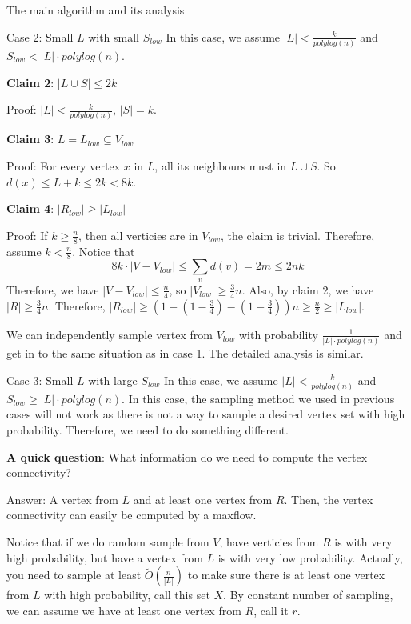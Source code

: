 \documentclass{article}
\begin{document}
\begin{section}{The main algorithm and its analysis}
  \begin{subsection}{Case 2: Small $L$ with small $S_{low}$}
    In this case, we assume $|L| < \frac{k}{polylog(n)}$ and $S_{low} < |L| \cdot polylog(n)$. 

    \textbf{Claim 2}: $|L \cup S| \leq 2k$ 

    Proof: $|L| < \frac{k}{polylog(n)}$, $|S| = k$. 

    \textbf{Claim 3}: $L = L_{low} \subseteq V_{low}$

    Proof: For every vertex $x$ in $L$, all its neighbours must in $L \cup S$. So $d(x) \leq L + k \leq 2k < 8k$. 

    \textbf{Claim 4}: $|R_{low}| \geq |L_{low}|$

    Proof: If $k \geq \frac{n}{8}$, then all verticies are in $V_{low}$, the claim is trivial. Therefore, assume $k < \frac{n}{8}$. Notice that 
    $$ 8k \cdot |V - V_{low}| \leq \sum_v d(v) = 2m \leq 2nk$$
    Therefore, we have $|V - V_{low}| \leq \frac{n}{4}$, so $|V_{low}| \geq \frac{3}{4}n$. Also, by claim 2, we have $|R| \geq \frac{3}{4}n$. Therefore, $|R_{low}| \geq (1 - (1 - \frac34) - (1 - \frac34))n \geq \frac{n}{2} \geq |L_{low}|$. 

    We can independently sample vertex from $V_{low}$ with probability $\frac{1}{|L| \cdot polylog(n)}$ and get in to the same situation as in case 1. The detailed analysis is similar. 
    
  \end{subsection}

  \begin{subsection}{Case 3: Small $L$ with large $S_{low}$}
    In this case, we assume $|L| < \frac{k}{polylog(n)}$ and $S_{low} \geq |L| \cdot polylog(n)$. In this case, the sampling method we used in previous cases will not work as there is not a way to sample a desired vertex set with high probability. Therefore, we need to do something different. 

    \textbf{A quick question}: What information do we need to compute the vertex connectivity? 

    Answer: A vertex from $L$ and at least one vertex from $R$. Then, the vertex connectivity can easily be computed by a maxflow. 

    Notice that if we do random sample from $V$, have verticies from $R$ is with very high probability, but have a vertex from $L$ is with very low probability. Actually, you need to sample at least $\tilde{O}(\frac{n}{|L|})$ to make sure there is at least one vertex from $L$ with high probability, call this set $X$. By constant number of sampling, we can assume we have at least one vertex from $R$, call it $r$.


\end{subsection}
\end{section}
\end{document}
